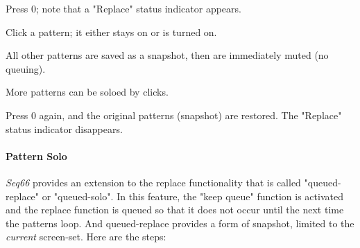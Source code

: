    \begin{enumber}
      \item Press 0; note that a "Replace" status indicator appears.
      \item Click a pattern; it either stays on or is turned on.
      \item All other patterns are saved as a snapshot, then are immediately
          muted (no queuing).
      \item More patterns can be soloed by clicks.
      \item Press 0 again, and the original patterns (snapshot) are restored.
          The "Replace" status indicator disappears.
   \end{enumber}

\paragraph{Pattern Solo}
\label{paragraph:patterns_pattern_solo}

   \textsl{Seq66} provides an extension to the replace functionality
   that is called "queued-replace" or "queued-solo".
   In this feature, the "keep queue" function is activated and the
   replace function is queued so that it does not occur until the next
   time the patterns loop.
   And queued-replace provides a form of snapshot, limited to the
   \textsl{current} screen-set.
   Here are the steps:

